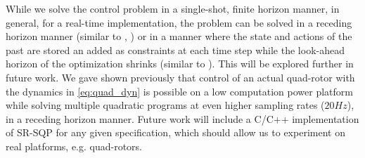 While we solve the control problem in a single-shot, finite horizon manner, in general, for a real-time implementation, the problem can be solved in a receding horizon manner (similar to \cite{PantAMNDM15_Anytime}, \cite{Jain2016}) or in a manner where the state and actions of the past are stored an added as constraints at each time step while the look-ahead horizon of the optimization shrinks (similar to \cite{Raman14_MPCSTL}). This will be explored further in future work. We gave shown previously \cite{PantAMNDM15_Anytime} that control of an actual quad-rotor with the dynamics in \eqref{eq:quad_dyn} is possible on a low computation power platform while solving multiple quadratic programs at even higher sampling rates ($20Hz$), in a receding horizon manner. Future work will include a C/C++ implementation of SR-SQP for any given specification, which should allow us to experiment on real platforms, e.g. quad-rotors.
